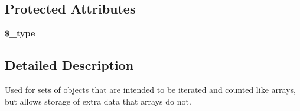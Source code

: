 \subsection*{Protected Attributes}
\begin{DoxyCompactItemize}
\item 
\hypertarget{classCollection_a4273177d393e56c83a13923c3bd6f499}{
{\bfseries \$\_\-type}}
\label{classCollection_a4273177d393e56c83a13923c3bd6f499}

\end{DoxyCompactItemize}


\subsection{Detailed Description}
Used for sets of objects that are intended to be iterated and counted like arrays, but allows storage of extra data that arrays do not. 

